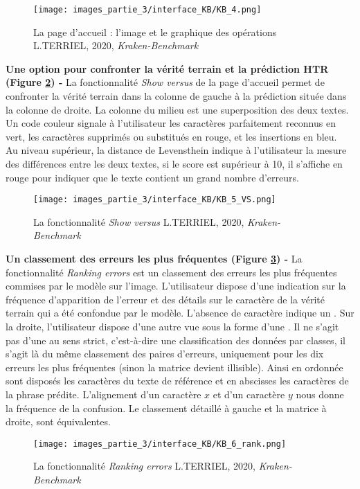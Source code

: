 \begin{figure}[H]
    \centering
    \texttt{[image: images\_partie\_3/interface\_KB/KB\_4.png]}
        \caption{La page d'accueil : l'image et le graphique des opérations \textcopyright L.TERRIEL, 2020, \textit{Kraken-Benchmark}}
        \label{fig:accueil_KB_2}
\end{figure}
\newpage
\textbf{Une option pour confronter la vérité terrain et la prédiction HTR (Figure \ref{fig:accueil_KB_3}) - } La fonctionnalité \textit{Show versus} de la page d'accueil permet de confronter la vérité terrain dans la colonne de gauche à la prédiction située dans la colonne de droite. La colonne du milieu est une superposition des deux textes. Un code couleur signale à l'utilisateur les caractères parfaitement reconnus en vert, les caractères supprimés ou substitués en rouge, et les insertions en bleu. \\ Au niveau supérieur, la distance de Levensthein indique à l'utilisateur la mesure des différences entre les deux textes, si le score est supérieur à 10, il s'affiche en rouge pour indiquer que le texte contient un grand nombre d'erreurs.
\begin{figure}[H]
    \centering
    \texttt{[image: images\_partie\_3/interface\_KB/KB\_5\_VS.png]}
        \caption{La fonctionnalité \textit{Show versus} \textcopyright L.TERRIEL, 2020, \textit{Kraken-Benchmark}}
        \label{fig:accueil_KB_3}
\end{figure}
\bigskip

\textbf{Un classement des erreurs les plus fréquentes (Figure \ref{fig:accueil_KB_4}) - }  La fonctionnalité \textit{Ranking errors} est un classement des erreurs les plus fréquentes commises par le modèle sur l'image. L'utilisateur dispose d'une indication sur la fréquence d'apparition de l'erreur et des détails sur le caractère de la vérité terrain qui a été confondue par le modèle. L'absence de caractère indique un . Sur la droite, l'utilisateur dispose d'une autre vue sous la forme d'une . Il ne s'agit pas d'une  au sens strict, c'est-à-dire une classification des données par classes, il s'agit là du même classement des paires d'erreurs, uniquement pour les dix erreurs les plus fréquentes (sinon la matrice devient illisible). \newpage Ainsi en ordonnée sont disposés les caractères du texte de référence et en abscisses les caractères de la phrase prédite. L'alignement d'un caractère $x$ et d'un caractère $y$ nous donne la fréquence de la confusion. Le classement détaillé à gauche et la matrice à droite, sont équivalentes. 
\begin{figure}[H]
    \centering
    \texttt{[image: images\_partie\_3/interface\_KB/KB\_6\_rank.png]}
        \caption{La fonctionnalité \textit{Ranking errors} \textcopyright L.TERRIEL, 2020, \textit{Kraken-Benchmark}}
        \label{fig:accueil_KB_4}
\end{figure}
\bigskip

